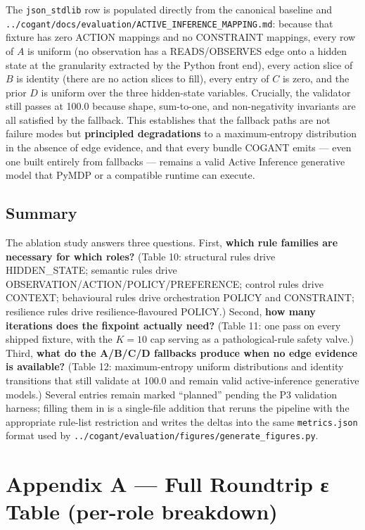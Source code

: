 \documentclass[
]{article}
\begin{document}
The \texttt{json\_stdlib} row is populated directly from the canonical
baseline and
\texttt{../cogant/docs/evaluation/ACTIVE\_INFERENCE\_MAPPING.md}:
because that fixture has zero ACTION mappings and no CONSTRAINT
mappings, every row of \(A\) is uniform (no observation has a
READS/OBSERVES edge onto a hidden state at the granularity extracted by
the Python front end), every action slice of \(B\) is identity (there
are no action slices to fill), every entry of \(C\) is zero, and the
prior \(D\) is uniform over the three hidden-state variables. Crucially,
the validator still passes at 100.0 because shape, sum-to-one, and
non-negativity invariants are all satisfied by the fallback. This
establishes that the fallback paths are not failure modes but
\textbf{principled degradations} to a maximum-entropy distribution in
the absence of edge evidence, and that every bundle COGANT emits ---
even one built entirely from fallbacks --- remains a valid Active
Inference generative model that PyMDP or a compatible runtime can
execute.

\subsection{Summary}\label{summary}

The ablation study answers three questions. First, \textbf{which rule
families are necessary for which roles?} (Table 10: structural rules
drive HIDDEN\_STATE; semantic rules drive
OBSERVATION/ACTION/POLICY/PREFERENCE; control rules drive CONTEXT;
behavioural rules drive orchestration POLICY and CONSTRAINT; resilience
rules drive resilience-flavoured POLICY.) Second, \textbf{how many
iterations does the fixpoint actually need?} (Table 11: one pass on
every shipped fixture, with the \(K = 10\) cap serving as a
pathological-rule safety valve.) Third, \textbf{what do the A/B/C/D
fallbacks produce when no edge evidence is available?} (Table 12:
maximum-entropy uniform distributions and identity transitions that
still validate at 100.0 and remain valid active-inference generative
models.) Several entries remain marked ``planned'' pending the P3
validation harness; filling them in is a single-file addition that
reruns the pipeline with the appropriate rule-list restriction and
writes the deltas into the same \texttt{metrics.json} format used by
\texttt{../cogant/evaluation/figures/generate\_figures.py}.

\newpage

\section{Appendix A --- Full Roundtrip ε Table (per-role
breakdown)}\label{appendix-a-full-roundtrip-ux3b5-table-per-role-breakdown}
\end{document}
